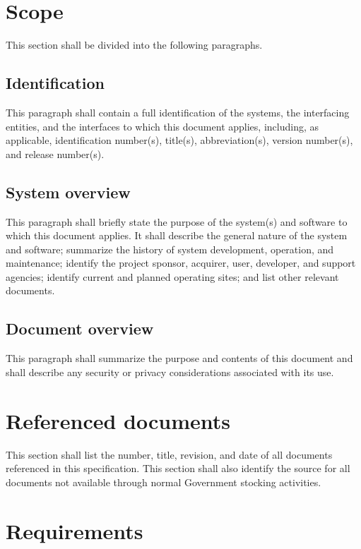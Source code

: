 \section{Scope}

This section shall be divided into the following paragraphs.

\subsection{Identification}

This paragraph shall contain a full identification of the systems, the
interfacing entities, and the interfaces to which this document applies,
including, as applicable, identification number(s), title(s),
abbreviation(s), version number(s), and release number(s).

\subsection{System overview}

This paragraph shall briefly state the purpose of the system(s) and
software to which this document applies. It shall describe the general
nature of the system and software; summarize the history of system
development, operation, and maintenance; identify the project sponsor,
acquirer, user, developer, and support agencies; identify current and
planned operating sites; and list other relevant documents.

\subsection{Document overview}

This paragraph shall summarize the purpose and contents of this document
and shall describe any security or privacy considerations associated
with its use.

\section{Referenced documents}

This section shall list the number, title, revision, and date of all
documents referenced in this specification. This section shall also
identify the source for all documents not available through normal
Government stocking activities.

\section{Requirements}

